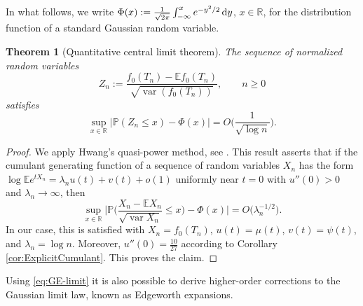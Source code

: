 \documentclass[11pt,a4paper]{article}
\numberwithin{equation}{section}
\newtheorem {theorem}{Theorem}[section]
\newcommand{\var}{\operatorname{var}}
\newcommand{\dint}{\textup{d}}
\def\EE{\mathbb{E}}
\def\PP{\mathbb{P}}
\def\RR{\mathbb{R}}
\begin{document}
In what follows, we write $\Phi(x):={1\over\sqrt{2\pi}}\int_{-\infty}^x e^{-y^2/2}\,\dint y$, $x\in\RR$, for the distribution function of a standard Gaussian random variable.


\begin{theorem}[Quantitative central limit theorem]\label{thm:CLT-rate}
The sequence of normalized random variables
\begin{equation*}
    Z_n:=\frac{f_0(T_n)- \EE f_0(T_n)}{\sqrt{\var(f_0(T_n))}},\qquad n\geq 0
\end{equation*}
satisfies 
\begin{equation*}
    \sup_{x\in\RR}\bigl|\PP(Z_n\le x)-\Phi(x)\bigr|=O\Big(\frac{1}{\sqrt{\log n}}\Big).
\end{equation*}
\end{theorem}
\begin{proof}
We apply Hwang's quasi-power method, see \cite[Section IX.5]{FS:2009}. This result asserts that if the cumulant
generating function of a sequence of random variables $X_n$ has the form
$\log \EE e^{tX_n}=\lambda_n u(t)+v(t)+o(1)$ uniformly near $t=0$ with
$u''(0)>0$ and $\lambda_n\to\infty$, then
\begin{equation*}
    \sup_{x\in\RR}\Big|\PP\Big(\frac{X_n-\EE X_n}{\sqrt{\var X_n}}\le x\Big)-\Phi(x)\Big|
        = O\big(\lambda_n^{-1/2}\big).
\end{equation*}
In our case, this is satisfied with $X_n=f_0(T_n)$, $u(t)=\mu(t)$, $v(t)=\psi(t)$, and $\lambda_n=\log n$. Moreover, $u''(0)=\tfrac{10}{27}$ according to Corollary \ref{cor:ExplicitCumulant}. This proves the claim. 
\end{proof}


Using \eqref{eq:GE-limit} it is also possible to derive higher-order corrections to the Gaussian limit law, known as Edgeworth expansions.
\end{document}
